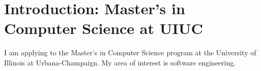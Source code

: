 \section*{Introduction: Master’s in Computer Science at UIUC}
I am applying to the Master’s in Computer Science program at the University of Illinois at Urbana-Champaign. 
My area of interest is software engineering.